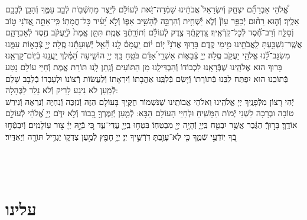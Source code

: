\documentclass[twoside, openany, parskip=half, 11pt]{book}
\begin{document}
\begin{sometimes}
	אֱ֠לֹהֵי אַבְרָהָ֞ם יִצְחָ֤ק וְֿיִשְׂרָאֵל֙ אֲבֹתֵ֔ינוּ שָׁמְֿרָה־זֹּ֣את לְֿעוֹלָ֔ם לְֿיֵ֥צֶר מַחְשְֿׁב֖וֹת לְֿבַ֣ב עַמֶּ֑ךָ וְֿהָכֵ֥ן לְֿבָבָ֖ם אֵלֶֽיךָ׃ וְֿה֤וּא
	רַח֨וּם יְֿכַפֵּ֥ר עָוֹן֘ וְֿלֹ֢א יַ֫שְׁחִ֥ית וְֿהִרְבָּ֣ה לְֿהָשִׁ֣יב אַפּ֑וֹ וְֿלֹ֣א יָ֝עִ֗יר כׇּל־חֲמָתֽוֹ׃ כִּֽי־אַתָּ֣ה
	אֲ֭דֹנָי ט֣וֹב וְֿסַלָּ֑ח וְֿרַב־חֶ֝֗סֶד לְֿכׇל־קֹֽרְֿאֶֽיךָ׃ צִ֭דְקָֽתְֿךָ
	צֶ֥דֶק לְֿעוֹלָ֗ם וְֿתוֹרָֽתְֿךָ֥ אֱמֶֽת׃ תִּתֵּ֤ן
	אֱמֶת֙ לְֿיַֽעֲקֹ֔ב חֶ֖סֶד לְֿאַבְרָהָ֑ם אֲשֶֽׁר־נִשְׁבַּ֥עְתָּ לַֽאֲבֹתֵ֖ינוּ מִ֥ימֵי קֶֽדֶם׃ בָּר֥וּךְ
	אֲדֹנָי֘ י֤וֹם י֗וֹם יַֽעֲמָס֫ לָ֥נוּ הָ֘אֵ֤ל יְֿשֽׁוּעָתֵ֬נוּ סֶֽלָה׃ יְיָ֣
	צְֿבָא֣וֹת עִמָּ֑נוּ מִשְׂגָּב־לָ֝֗נוּ אֱלֹהֵ֖י יַעֲקֹ֣ב סֶֽלָה׃ יְיָ֥
	צְֿבָא֑וֹת אַשְׁרֵ֥י ֝אָדָ֗ם בֹּטֵ֥חַ בָּֽךְ׃ יְיָ֥
	הוֹשִׁ֑יעָה הַ֝מֶּ֗לֶךְ יַֽעֲנֵ֥נוּ בְֿיֽוֹם־קׇרְאֵֽנוּ׃ \\
	בָּרוּךְ הוּא אֱלֹהֵֽינוּ שֶׁבְּֿרָאָֽנוּ לִכְבוֹדוֹ וְֿהִבְדִּילָֽנוּ מִן הַתּוֹעִים וְֿנָֽתַן לָֽנוּ תּוֹרַת אֱמֶת וְֿחַיֵּי עוֹלָם נָטַע בְּֿתוֹכֵֽנוּ הוּא יִפְתַּח לִבֵּֽנוּ בְּֿתוֹרָתוֹ וְֿיָשֵׂם בְּֿלִבֵּֽנוּ אַהֲבָתוֹ וְֿיִרְאָתוֹ וְֿלַעֲשׂוֹת רְֿצוֹנוֹ וּלְעָבְדוֹ בְֿלֵבָב שָׁלֵם לְֿמַֽעַן לֹא נִיגַע לָרִיק וְֿלֹא נֵלֵד לַבֶּהָלָה:\\
	יְֿהִי רָצוֹן מִלְּֿפָנֶֽיךָ יְיָ אֱלֹהֵֽינוּ וֵאלֹהֵי אֲבוֹתֵֽינוּ שֶׁנִּשְׁמוֹר חֻקֶּֽיךָ בָּעוֹלָם הַזֶּה וְֿנִזְכֶּה וְֿנִחְיֶה וְֿנִרְאֶה וְֿנִירַשׁ טוֹבָה וּבְרָכָה לִשְׁנֵי יְֿמוֹת הַמָּשִֽׁיחַ וּלְחַיֵּי הָעוֹלָם הַבָּא: לְֿמַ֤עַן יְֿזַמֶּרְךָ֣ כָ֭בוֹד וְֿלֹ֣א יִדֹּ֑ם יְיָ֥ אֱ֝לֹהַ֗י לְֿעוֹלָ֣ם אוֹדֶֽךָּ׃ בָּר֣וּךְֿ הַגֶּ֔בֶר אֲשֶׁ֥ר יִבְטַ֖ח בַּֽיְיָ֑ וְֿהָיָ֥ה יְיָ֖ מִבְטַחֽוֹ׃ בִּטְח֥וּ
	בַֽיְיָ֖ עֲדֵי־עַ֑ד כִּ֚י בְּֿיָ֣הּ יְיָ֔ צ֖וּר עֽוֹלָמִֽים׃ וְֿיִבְטְֿח֣וּ
	בְֿ֭ךָ יֽוֹדְֿעֵ֣י שְֿׁמֶ֑ךָ כִּ֤י לֹֽא־עָזַ֖בְתָּ דֹֽרְֿשֶׁ֣יךָ יְיָ׃ יְיָ֥
	חָפֵ֖ץ לְֿמַ֣עַן צִדְק֑וֹ יַגְדִּ֥יל תּוֹרָ֖ה וְֿיַאְדִּֽיר׃
	
\end{sometimes}

\fullkaddish

\vfill

\\
\\

\clearpage
\section*{ עלינו }
\end{document}
